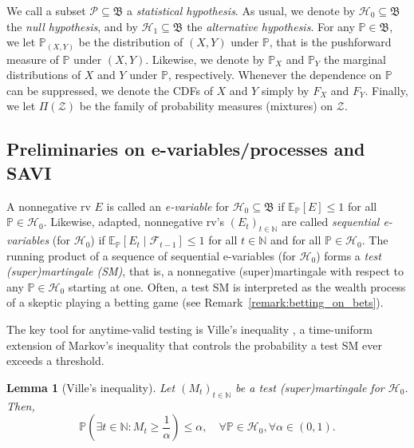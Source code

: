 \documentclass[12pt,twoside]{article}
\theoremstyle{plain}
\newtheorem{lemma}{Lemma}
\theoremstyle{definition}
\theoremstyle{remark}
\newcommand{\N}{\mathbb{N}}
\newcommand{\calF}{\mathcal{F}}
\newcommand{\calH}{\mathcal{H}}
\newcommand{\calP}{\mathcal{P}}
\newcommand{\calZ}{\mathcal{Z}}
\newcommand{\Esymb}{\mathbb{E}}
\newcommand{\Psymb}{\mathbb{P}}
\newcommand{\Ex}[2]{\Esymb_{{#1}}\left[{#2}\right]}
\newcommand{\frakB}{\mathfrak{B}}
\begin{document}
We call a subset $\calP \subseteq \frakB$ a \emph{statistical hypothesis}. As usual, we denote by $\calH_0 \subseteq \frakB$ the \emph{null hypothesis}, and by $\calH_1 \subseteq \frakB$ the \emph{alternative hypothesis}. 
For any ${\Psymb}\in \frakB$, we let $\Psymb_{(X,Y)}$ be the distribution of $(X,Y)$ under ${\Psymb}$, that is the pushforward measure of ${\Psymb}$ under $(X,Y)$. Likewise, we denote by $\Psymb_X$ and $\Psymb_Y$ the marginal distributions of $X$ and $Y$ under ${\Psymb}$, respectively. 
Whenever the dependence on $\Psymb$ can be suppressed, we denote the CDFs of $X$ and $Y$ simply by $F_X$ and $F_Y$. Finally, we let $\Pi(\calZ)$ be the family of probability measures (mixtures) on $\calZ$. 

\subsection{Preliminaries on e-variables/processes and SAVI}

A nonnegative rv $E$ is called an \emph{e-variable} for $\calH_0 \subseteq \frakB$ if $\Ex{\Psymb}{E} \leq 1$ for all ${\Psymb} \in \calH_0$. 
Likewise, adapted, nonnegative rv's $(E_t)_{t\in \N}$ are called \emph{sequential e-variables} (for $\calH_0$) if $\Esymb_{\Psymb}[E_t\mid \calF_{t-1}] \leq 1$ for all $t\in \N$ and for all $\Psymb\in\calH_0$. 
The running product of a sequence of sequential e-variables (for $\calH_0$) forms a \emph{test (super)martingale (SM)}, that is, a nonnegative (super)martingale with respect to any $\Psymb\in \calH_0$ starting at one.
Often, a test SM is interpreted as the wealth process of a skeptic playing a betting game (see Remark~\ref{remark:betting_on_bets}). 


The key tool for anytime-valid testing is Ville's inequality \citep{ville1939etude}, a time-uniform extension of Markov's inequality that controls the probability a test SM ever exceeds a threshold.
\begin{lemma}[Ville's inequality]\label{lem:Ville}
    Let $(M_t)_{t\in \N}$ be a test (super)martingale for $\calH_0$. Then, 
    \begin{equation}\label{eq:Ville}
        \Psymb\left(\exists t\in \N: M_t \geq \frac{1}{\alpha}\right) \leq \alpha, \quad \forall \Psymb \in \calH_0, \forall \alpha \in (0,1). 
    \end{equation}
\end{lemma}
\end{document}
